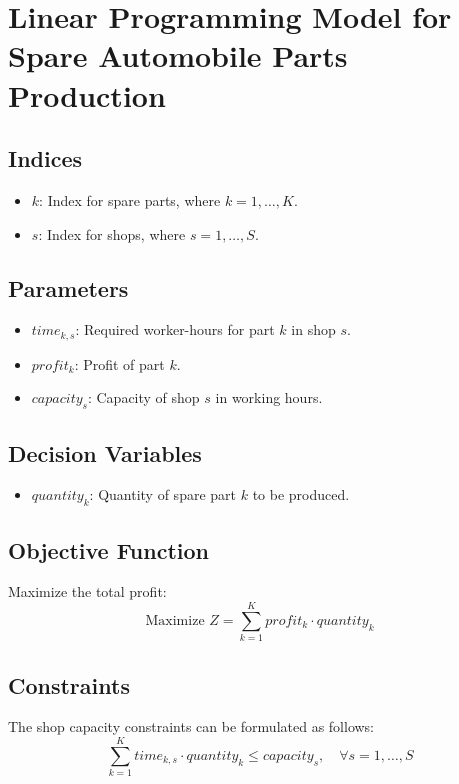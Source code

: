 \documentclass{article}
\begin{document}
\section*{Linear Programming Model for Spare Automobile Parts Production}

\subsection*{Indices}
\begin{itemize}
    \item $k$: Index for spare parts, where $k = 1, \ldots, K$.
    \item $s$: Index for shops, where $s = 1, \ldots, S$.
\end{itemize}

\subsection*{Parameters}
\begin{itemize}
    \item $time_{k,s}$: Required worker-hours for part $k$ in shop $s$.
    \item $profit_{k}$: Profit of part $k$.
    \item $capacity_{s}$: Capacity of shop $s$ in working hours.
\end{itemize}

\subsection*{Decision Variables}
\begin{itemize}
    \item $quantity_{k}$: Quantity of spare part $k$ to be produced.
\end{itemize}

\subsection*{Objective Function}
Maximize the total profit:
\[
\text{Maximize } Z = \sum_{k=1}^{K} profit_{k} \cdot quantity_{k}
\]

\subsection*{Constraints}
The shop capacity constraints can be formulated as follows:
\[
\sum_{k=1}^{K} time_{k,s} \cdot quantity_{k} \leq capacity_{s}, \quad \forall s = 1, \ldots, S
\]
\end{document}

